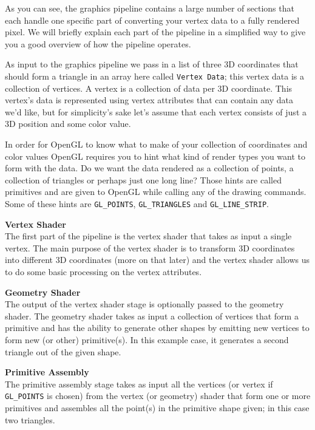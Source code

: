 As you can see, the graphics pipeline contains a large number of sections that each handle one specific part of converting your vertex data to a fully rendered pixel. We will briefly explain each part of the pipeline in a simplified way to give you a good overview of how the pipeline operates.

As input to the graphics pipeline we pass in a list of three 3D coordinates that should form a triangle in an array here called \verb|Vertex Data|; this vertex data is a collection of vertices. A vertex is a collection of data per 3D coordinate. This vertex's data is represented using vertex attributes that can contain any data we'd like, but for simplicity's sake let's assume that each vertex consists of just a 3D position and some color value.

\begin{note}
    In order for OpenGL to know what to make of your collection of coordinates and color values OpenGL requires you to hint what kind of render types you want to form with the data. Do we want the data rendered as a collection of points, a collection of triangles or perhaps just one long line? Those hints are called primitives and are given to OpenGL while calling any of the drawing commands. Some of these hints are \verb|GL_POINTS|, \verb|GL_TRIANGLES| and \verb|GL_LINE_STRIP|.
\end{note}

\begin{center}
    \textbf{Vertex Shader}\\
    The first part of the pipeline is the vertex shader that takes as input a single vertex. The main purpose of the vertex shader is to transform 3D coordinates into different 3D coordinates (more on that later) and the vertex shader allows us to do some basic processing on the vertex attributes.
\end{center}

\begin{center}
    \textbf{Geometry Shader}\\
    The output of the vertex shader stage is optionally passed to the geometry shader. The geometry shader takes as input a collection of vertices that form a primitive and has the ability to generate other shapes by emitting new vertices to form new (or other) primitive(s). In this example case, it generates a second triangle out of the given shape.
\end{center}

\newpage

\begin{center}
    \textbf{Primitive Assembly}\\
    The primitive assembly stage takes as input all the vertices (or vertex if \verb|GL_POINTS| is chosen) from the vertex (or geometry) shader that form one or more primitives and assembles all the point(s) in the primitive shape given; in this case two triangles.
\end{center}

